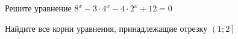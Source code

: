 \begin{ex}
	\begin{condition}
		\begin{enumcols}[label=\asbuk*)]
			\item Решите уравнение \( 8^x - 3\cdot 4^x -4\cdot2^x + 12 = 0 \)
			\item Найдите все корни уравнения, принадлежащие отрезку \( \left(1;2\right] \)
		\end{enumcols}
	\end{condition}
\end{ex}
